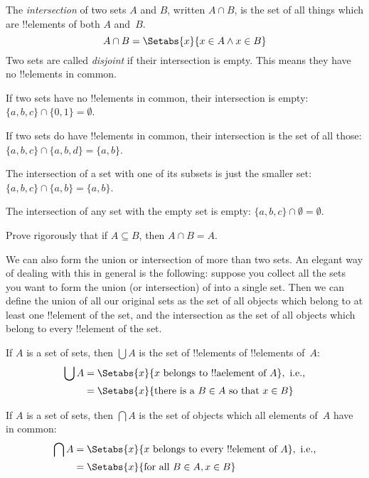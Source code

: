 \documentclass[../../../include/open-logic-section]{subfiles}
\begin{document}
\begin{defn}[Intersection]
The \emph{intersection} of two sets $A$ and $B$, written $A \cap B$, is
the set of all things which are !!{element}s of both $A$ and~$B$.
\[
A \cap B = \Setabs{x}{x \in A \land x \in B}
\]
Two sets are called \emph{disjoint} if their intersection is
empty. This means they have no !!{element}s in common.
\end{defn}

\begin{ex}
If two sets have no !!{element}s in common, their intersection is empty:
$\{ a, b, c\} \cap \{ 0, 1\} = \emptyset$.

If two sets do have !!{element}s in common, their intersection is the set of
all those: $\{a, b, c \} \cap \{a, b, d \} = \{a, b\}$.

The intersection of a set with one of its subsets is just the smaller
set: $\{a, b, c\} \cap \{a, b\} = \{a, b\}$.

The intersection of any set with the empty set is empty: $\{a, b, c \}
\cap \emptyset = \emptyset$.
\end{ex}

\begin{prob}
Prove rigorously that if $A \subseteq B$, then $A \cap B = A$.
\end{prob}

\begin{explain}
We can also form the union or intersection of more than two
sets. An elegant way of dealing with this in general is the
following: suppose you collect all the sets you want to form the union
(or intersection) of into a single set. Then we can define the union
of all our original sets as the set of all objects which belong to at
least one !!{element} of the set, and the intersection as the set of
all objects which belong to every !!{element} of the set.
\end{explain}

\begin{defn}
If $A$ is a set of sets, then $\bigcup A$ is the set of !!{element}s of
!!{element}s of~$A$:
\begin{align*}
\bigcup A & = \Setabs{x}{x \text{ belongs to !!a{element} of } A},
\text{ i.e.,}\\
& = \Setabs{x}{\text{there is a } B \in A
  \text{ so that } x \in B}
\end{align*}
\end{defn}

\begin{defn}
If $A$ is a set of sets, then $\bigcap A$ is the set of objects which
all elements of~$A$ have in common:
\begin{align*}
\bigcap A & = \Setabs{x}{x \text{ belongs to every !!{element} of } A},
\text{ i.e.,}\\
 & = \Setabs{x}{\text{for all } B \in A, x \in B}
\end{align*}
\end{defn}
\end{document}
